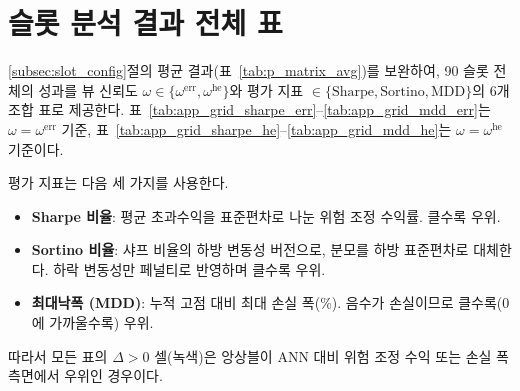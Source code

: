 \documentclass{article}
\begin{document}
\section{슬롯 분석 결과 전체 표}\label{app:result_table}

\ref{subsec:slot_config}절의 평균 결과(표~\ref{tab:p_matrix_avg})를 보완하여, 90 슬롯 전체의 성과를 뷰 신뢰도 $\omega \in \{\omega^{\mathrm{err}}, \omega^{\mathrm{he}}\}$와 평가 지표 $\in \{\text{Sharpe}, \text{Sortino}, \text{MDD}\}$의 6개 조합 표로 제공한다. 표~\ref{tab:app_grid_sharpe_err}--\ref{tab:app_grid_mdd_err}는 $\omega = \omega^{\mathrm{err}}$ 기준, 표~\ref{tab:app_grid_sharpe_he}--\ref{tab:app_grid_mdd_he}는 $\omega = \omega^{\mathrm{he}}$ 기준이다.

평가 지표는 다음 세 가지를 사용한다.
\begin{itemize}
  \item \textbf{Sharpe 비율}: 평균 초과수익을 표준편차로 나눈 위험 조정 수익률. 클수록 우위.
  \item \textbf{Sortino 비율}: 샤프 비율의 하방 변동성 버전으로, 분모를 하방 표준편차로 대체한다\citep{sortino1994}. 하락 변동성만 페널티로 반영하며 클수록 우위.
  \item \textbf{최대낙폭 (MDD)}: 누적 고점 대비 최대 손실 폭(\%). 음수가 손실이므로 클수록(0 에 가까울수록) 우위.
\end{itemize}
따라서 모든 표의 $\Delta > 0$ 셀(녹색)은 앙상블이 ANN 대비 위험 조정 수익 또는 손실 폭 측면에서 우위인 경우이다.
\end{document}
